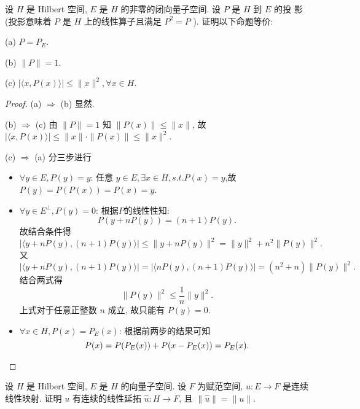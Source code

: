 \begin{exercise}
    设 $H$ 是 Hilbert 空间, $E$ 是 $H$ 的非零的闭向量子空间. 
    设 $P$ 是 $H$ 到 $E$ 的投 影 (投影意味着 $P$ 是 $H$ 上的线性算子且满足 $P^{2}=P$ ). 证明以下命题等价:
    
    (a) $P=P_{E}$.
    
    (b) $\|P\|=1$.
    
    (c) $|\langle x, P(x)\rangle| \leq\|x\|^{2}, \forall x \in H$.
\end{exercise}

\begin{proof}
    (a) $\Rightarrow$ (b) 显然.

    (b) $\Rightarrow$ (c)
    由 $\|P\|=1$ 知 $\|P(x)\|\leq\|x\|$, 故 $|\langle x,P(x)\rangle|\leq\|x\|\cdot\|P(x)\|\leq\|x\|^2$.

    (c) $\Rightarrow$ (a)
    分三步进行
    \begin{itemize}
    \item $\forall y\in E,P(y)=y$: 任意 $y\in E,\exists x\in H,s.t.P(x)=y$,故$P(y)=P(P(x))=P(x)=y$.
    \item $\forall y\in E^{\perp},P(y)=0$: 根据$P$的线性性知:
    \[P(y+nP(y))=(n+1)P(y).\]
    故结合条件得
    \[|\langle y+nP(y),(n+1)P(y)\rangle|\leq\|y+nP(y)\|^2=\|y\|^2+n^2\|P(y)\|^2.\]
    又
    \[|\langle y+nP(y),(n+1)P(y)\rangle|=|\langle nP(y),(n+1)P(y)\rangle|=(n^2+n)\|P(y)\|^2.\]
    结合两式得
    \[\|P(y)\|^2\leq\frac{1}{n}\|y\|^2.\]
    上式对于任意正整数 $n$ 成立, 故只能有 $P(y)=0$.
    \item $\forall x\in H,P(x)=P_E(x)$: 根据前两步的结果可知
    \[P(x)=P(P_E(x))+P(x-P_E(x))=P_E(x).\qedhere\]
    \end{itemize}
\end{proof}




\begin{exercise}
    设 $H$ 是 Hilbert 空间, $E$ 是 $H$ 的向量子空间. 
    设 $F$ 为赋范空间, $u: E \rightarrow F$ 是连续线性映射. 
    证明 $u$ 有连续的线性延拓 $\widehat{u}: H \rightarrow F$, 且 $\|\widehat{u}\|=\|u\|$.
\end{exercise}


